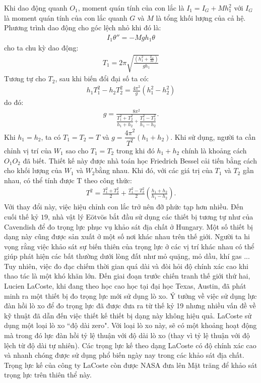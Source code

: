 \begin{multicols}{2}
\begin{figure}[H]
		\vspace*{-10pt}
	\end{figure}
	Khi dao động quanh $O_1$, moment quán tính của con lắc là $I_1=I_G+Mh_1^2$ với $I_G$ là moment quán tính của con lắc quanh $G$ và $M$ là tổng khối lượng của cả hệ. Phương trình dao động cho góc lệch nhỏ khi đó là:
	\begin{align*}
		I_1\theta''=-Mgh_1 \theta
	\end{align*}
	cho ta chu kỳ dao động:
	\begin{align*}
		T_1 = 2\pi \sqrt{\frac{\left(h_1^2 + \frac{I_G}{M}\right)}{gh_1}}
	\end{align*}
	Tương tự cho $T_2$, sau khi biến đổi đại số ta có:
	\begin{align*}
		h_1T_1^2 - h_2T_2^2 = \frac{4 \pi^2}{g}\left(h_1^2 - h_2^2\right)
	\end{align*}
	do đó:
	\begin{align*}
		g = \frac{8\pi^2}{\dfrac{T_1^2 + T_2^2}{h_1 + h_2} + \dfrac{T_1^2 -T_2^2}{h_1 - h_2}}.
	\end{align*}
	Khi $h_1=h_2$, ta có $T_1=T_2=T$ và $g=\dfrac{4\pi^2}{T^2}(h_1+h_2)$.
	\vskip 0.1cm
	Khi sử dụng, người ta cần chỉnh vị trí của $W_1$ sao cho $T_1=T_2$ trong khi đó $h_1+h_2$ chính là khoảng cách $O_1O_2$ đã biết.
	\vskip 0.1cm
	Thiết kế này được nhà toán học Friedrich Bessel cải tiến bằng cách cho khối lượng của $W_1$ và $W_2 $bằng nhau. Khi đó, với các giá trị của $T_1$ và $T_2$ gần nhau, có thể tính được T theo công thức:
	\begin{align*}
		T^2 = \frac{T_1^2 + T_2^2}{2} + \frac{T_1^2 - T_2^2}{2}\left(\frac{h_1 + h_2}{h_1 - h_2}\right).
	\end{align*}
	Với thay đổi này, việc hiệu chỉnh con lắc trở nên đỡ phức tạp hơn nhiều.
	\vskip 0.1cm
	Đến cuối thế kỷ $19$, nhà vật lý Eötvös bắt đầu sử dụng các thiết bị tương tự như của Cavendish để đo trọng lực phục vụ khảo sát địa chất ở Hungary. Một số thiết bị dạng này cũng được sản xuất ở một số nơi khác nhau trên thế giới. Người ta hi vọng rằng việc khảo sát sự biến thiên của trọng lực ở các vị trí khác nhau có thể giúp phát hiện các bất thường dưới lòng đất như mỏ quặng, mỏ dầu, khí gas ... Tuy nhiên, việc đo đạc chiếm thời gian quá dài và đòi hỏi độ chính xác cao khi thao tác là một khó khăn lớn.
	\vskip 0.1cm
	Đến giai đoạn trước chiến tranh thế giới thứ hai, Lucien LaCoste, khi đang theo học cao học tại đại học Texas, Austin, đã phát minh ra một thiết bị đo trọng lực mới sử dụng lò xo. Ý tưởng về việc sử dụng lực đàn hồi lò xo để đo trọng lực đã được đưa ra từ thế kỷ 19 nhưng nhiều vấn đề về kỹ thuật đã dẫn đến việc thiết kế thiết bị dạng này không hiệu quả. LaCoste sử dụng một loại lò xo ``độ dài zero". Với loại lò xo này, sẽ có một khoảng hoạt động mà trong đó lực đàn hồi tỷ lệ thuận với độ dài lò xo (thay vì tỷ lệ thuận với độ lệch từ độ dài tự nhiên). Các trọng lực kế theo dạng LaCoste có độ chính xác cao và nhanh chóng được sử dụng phổ biến ngày nay trong các khảo sát địa chất. Trọng lực kế của công ty LaCoste còn được NASA đưa lên Mặt trăng để khảo sát trọng lực trên thiên thể này.

\end{multicols}
